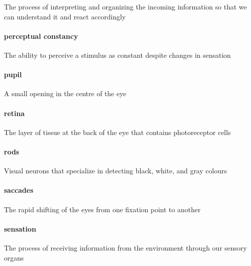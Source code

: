 \documentclass[
]{krantz}
\begin{document}
The process of interpreting and organizing the incoming information so that we can understand it and react accordingly

\hypertarget{perceptual-constancy}{%
\paragraph*{perceptual constancy}\label{perceptual-constancy}}

The ability to perceive a stimulus as constant despite changes in sensation

\hypertarget{pupil}{%
\paragraph*{pupil}\label{pupil}}

A small opening in the centre of the eye

\hypertarget{retina}{%
\paragraph*{retina}\label{retina}}

The layer of tissue at the back of the eye that contains photoreceptor cells

\hypertarget{rods}{%
\paragraph*{rods}\label{rods}}

Visual neurons that specialize in detecting black, white, and gray colours

\hypertarget{saccades}{%
\paragraph*{saccades}\label{saccades}}

The rapid shifting of the eyes from one fixation point to another

\hypertarget{sensation}{%
\paragraph*{sensation}\label{sensation}}

The process of receiving information from the environment through our sensory organs
\end{document}

